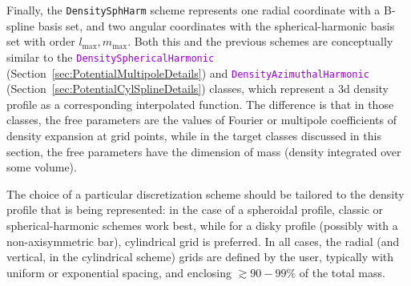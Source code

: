 \documentclass[12pt]{article}
\newcommand{\ttt}[1]{\textcolor{darkviolet}{\texttt{#1}}}
\newcommand{\ppp}[1]{\textcolor{darkolive} {\texttt{#1}}}
\begin{document}
Finally, the \ppp{DensitySphHarm} scheme represents one radial coordinate with a B-spline basis set, and two angular coordinates with the spherical-harmonic basis set with order $l_\mathrm{max},m_\mathrm{max}$. Both this and the previous schemes are conceptually similar to the \ttt{Density\-SphericalHarmonic} (Section~\ref{sec:PotentialMultipoleDetails}) and \ttt{DensityAzimuthalHarmonic} (Section~\ref{sec:PotentialCylSplineDetails}) classes, which represent a 3d density profile as a corresponding interpolated function. The difference is that in those classes, the free parameters are the values of Fourier or multipole coefficients of density expansion at grid points, while in the target classes discussed in this section, the free parameters have the dimension of mass (density integrated over some volume).

The choice of a particular discretization scheme should be tailored to the density profile that is being represented: in the case of a spheroidal profile, classic or spherical-harmonic schemes work best, while for a disky profile (possibly with a non-axisymmetric bar), cylindrical grid is preferred. In all cases, the radial (and vertical, in the cylindrical scheme) grids are defined by the user, typically with uniform or exponential spacing, and enclosing $\gtrsim 90-99\%$ of the total mass.
\end{document}
